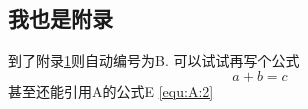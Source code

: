 \documentclass[a4paper]{article}
\begin{document}
\begin{spacing}{1.5}
\pagebreak[4]

\section{我也是附录}
\label{sec:B}
到了附录\ref{sec:B}则自动编号为B. 可以试试再写个公式
\begin{equation}
a+b=c
\end{equation}
甚至还能引用A的公式E \ref{equ:A:2}

\pagebreak[4]

\end{spacing}






\pagebreak[4]
\end{document}
